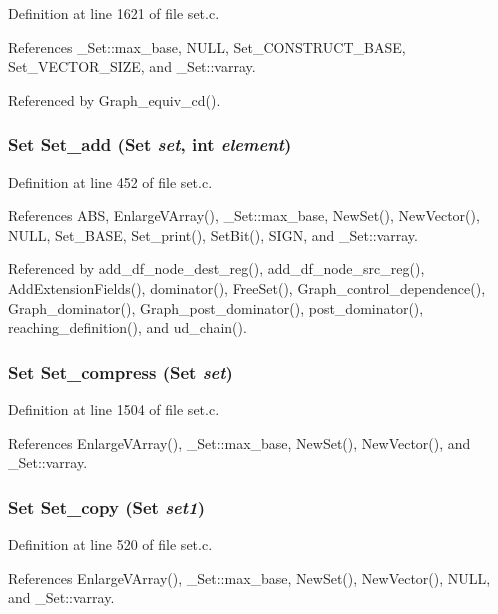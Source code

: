 Definition at line 1621 of file set.c.

References \_\-Set::max\_\-base, NULL, Set\_\-CONSTRUCT\_\-BASE, Set\_\-VECTOR\_\-SIZE, and \_\-Set::varray.

Referenced by Graph\_\-equiv\_\-cd().
\subsubsection{\setlength{\rightskip}{0pt plus 5cm}\bf{Set} Set\_\-add (\bf{Set} {\em set}, int {\em element})}\label{set_8c_e46584b68d26463394477e6040dc0b4f}




Definition at line 452 of file set.c.

References ABS, Enlarge\-VArray(), \_\-Set::max\_\-base, New\-Set(), New\-Vector(), NULL, Set\_\-BASE, Set\_\-print(), Set\-Bit(), SIGN, and \_\-Set::varray.

Referenced by add\_\-df\_\-node\_\-dest\_\-reg(), add\_\-df\_\-node\_\-src\_\-reg(), Add\-Extension\-Fields(), dominator(), Free\-Set(), Graph\_\-control\_\-dependence(), Graph\_\-dominator(), Graph\_\-post\_\-dominator(), post\_\-dominator(), reaching\_\-definition(), and ud\_\-chain().
\subsubsection{\setlength{\rightskip}{0pt plus 5cm}\bf{Set} Set\_\-compress (\bf{Set} {\em set})}\label{set_8c_fa52a5c9d51797279aecfda448c778ab}




Definition at line 1504 of file set.c.

References Enlarge\-VArray(), \_\-Set::max\_\-base, New\-Set(), New\-Vector(), and \_\-Set::varray.
\subsubsection{\setlength{\rightskip}{0pt plus 5cm}\bf{Set} Set\_\-copy (\bf{Set} {\em set1})}\label{set_8c_fd9347f41fba0349da2fb73dedc3e8b2}




Definition at line 520 of file set.c.

References Enlarge\-VArray(), \_\-Set::max\_\-base, New\-Set(), New\-Vector(), NULL, and \_\-Set::varray.
